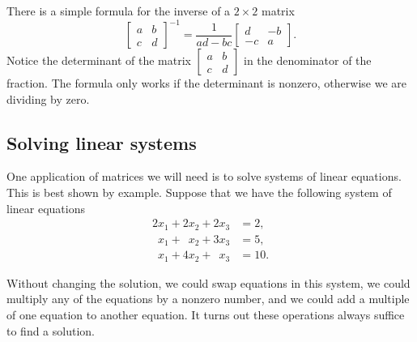 There is a simple formula for the inverse of a $2 \times 2$ matrix
\begin{equation*}
\begin{bmatrix}
a & b \\
c & d
\end{bmatrix}^{-1}
=
\frac{1}{ad-bc}
\begin{bmatrix}
d & -b \\
-c & a
\end{bmatrix} .
\end{equation*}
Notice the determinant of the matrix
$[\begin{smallmatrix}a&b\\c&d\end{smallmatrix}]$
in the denominator of the fraction.
The formula only works if the determinant is nonzero, otherwise we are
dividing by zero.

\subsection{Solving linear systems}

One application of matrices we will need is to solve systems of
linear equations.  This is best shown by example.
Suppose that we have the following system of linear equations
\begin{align*}
          2 x_1 +           2 x_2 +           2 x_3 & = 2 , \\
\phantom{9} x_1 + \phantom{9} x_2 +           3 x_3 & = 5 , \\
\phantom{9} x_1 +           4 x_2 + \phantom{9} x_3 & = 10 .
\end{align*}

Without changing the solution,
we could swap equations in this system,
we could multiply any of the equations by a nonzero number, and
we could add a multiple of one equation to another equation.
It turns out these operations always suffice to find a solution.

